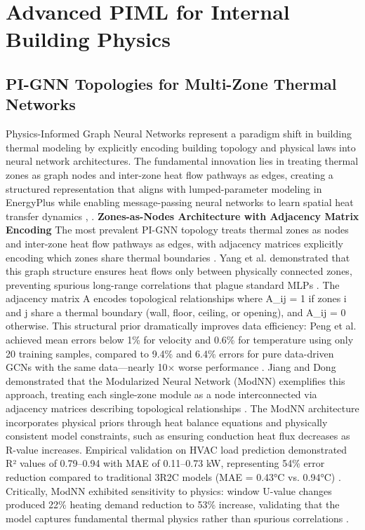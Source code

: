 \documentclass[12pt,a4paper]{article}
\begin{document}
\section{Advanced PIML for Internal Building Physics}
\subsection{PI-GNN Topologies for Multi-Zone Thermal Networks}
Physics-Informed Graph Neural Networks represent a paradigm shift in building thermal modeling by explicitly encoding building topology and physical laws into neural network architectures. The fundamental innovation lies in treating thermal zones as graph nodes and inter-zone heat flow pathways as edges, creating a structured representation that aligns with lumped-parameter modeling in EnergyPlus while enabling message-passing neural networks to learn spatial heat transfer dynamics \cite{ref13}, \cite{ref14}.
\textbf{Zones-as-Nodes Architecture with Adjacency Matrix Encoding}
The most prevalent PI-GNN topology treats thermal zones as nodes and inter-zone heat flow pathways as edges, with adjacency matrices explicitly encoding which zones share thermal boundaries \cite{ref179}. Yang et al. demonstrated that this graph structure ensures heat flows only between physically connected zones, preventing spurious long-range correlations that plague standard MLPs \cite{ref179}. The adjacency matrix A encodes topological relationships where A\_ij = 1 if zones i and j share a thermal boundary (wall, floor, ceiling, or opening), and A\_ij = 0 otherwise. This structural prior dramatically improves data efficiency: Peng et al. achieved mean errors below 1\% for velocity and 0.6\% for temperature using only 20 training samples, compared to 9.4\% and 6.4\% errors for pure data-driven GCNs with the same data---nearly 10× worse performance \cite{ref162}.
Jiang and Dong demonstrated that the Modularized Neural Network (ModNN) exemplifies this approach, treating each single-zone module as a node interconnected via adjacency matrices describing topological relationships \cite{ref25}. The ModNN architecture incorporates physical priors through heat balance equations and physically consistent model constraints, such as ensuring conduction heat flux decreases as R-value increases. Empirical validation on HVAC load prediction demonstrated R² values of 0.79--0.94 with MAE of 0.11--0.73 kW, representing 54\% error reduction compared to traditional 3R2C models (MAE = 0.43°C vs. 0.94°C) \cite{ref25}. Critically, ModNN exhibited sensitivity to physics: window U-value changes produced 22\% heating demand reduction to 53\% increase, validating that the model captures fundamental thermal physics rather than spurious correlations \cite{ref25}.
\end{document}
